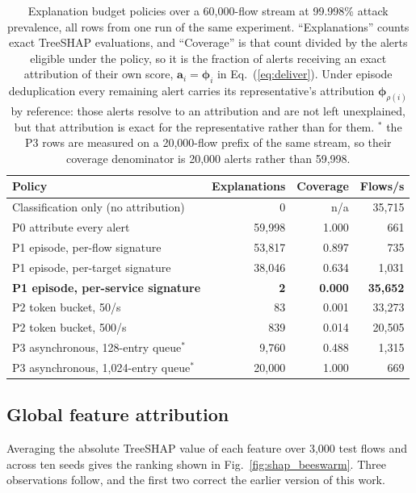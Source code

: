 \documentclass{ieeeaccess}
\begin{document}
\begin{table}[!t]
\caption{Explanation budget policies over a 60,000-flow stream at 99.998\% attack
prevalence, all rows from one run of the same experiment. ``Explanations'' counts
exact TreeSHAP evaluations, and ``Coverage'' is that count divided by the alerts
eligible under the policy, so it is the fraction of alerts receiving an exact
attribution of their own score, $\mathbf{a}_i = \boldsymbol{\phi}_i$ in
Eq.~(\ref{eq:deliver}). Under episode deduplication every remaining alert carries
its representative's attribution $\boldsymbol{\phi}_{\rho(i)}$ by reference: those
alerts resolve to an attribution and are not left unexplained, but that
attribution is exact for the representative rather than for them.
$^{\ast}$ the P3 rows are measured on a 20,000-flow prefix of the same stream, so
their coverage denominator is 20,000 alerts rather than 59,998.}
\centering
\label{tab:budget}
\footnotesize
\setlength{\tabcolsep}{4pt}
\renewcommand{\arraystretch}{1.15}
\begin{tabular}{@{}lrrr@{}}
\toprule
\textbf{Policy} & \textbf{Explanations} & \textbf{Coverage} & \textbf{Flows/s} \\
\midrule
Classification only (no attribution) & 0 & n/a & 35,715 \\
\midrule
P0 attribute every alert             & 59,998 & 1.000 & 661 \\
P1 episode, per-flow signature       & 53,817 & 0.897 & 735 \\
P1 episode, per-target signature     & 38,046 & 0.634 & 1,031 \\
\textbf{P1 episode, per-service signature} & \textbf{2} & \textbf{0.000} & \textbf{35,652} \\
P2 token bucket, 50/s                & 83 & 0.001 & 33,273 \\
P2 token bucket, 500/s               & 839 & 0.014 & 20,505 \\
P3 asynchronous, 128-entry queue$^{\ast}$   & 9,760 & 0.488 & 1,315 \\
P3 asynchronous, 1,024-entry queue$^{\ast}$ & 20,000 & 1.000 & 669 \\
\bottomrule
\end{tabular}
\end{table}

\subsection{Global feature attribution}
\label{sec:globalshap}
Averaging the absolute TreeSHAP value of each feature over 3{,}000 test flows and
across ten seeds gives the ranking shown in Fig.~\ref{fig:shap_beeswarm}. Three observations follow, and the first two
correct the earlier version of this work.
\end{document}
